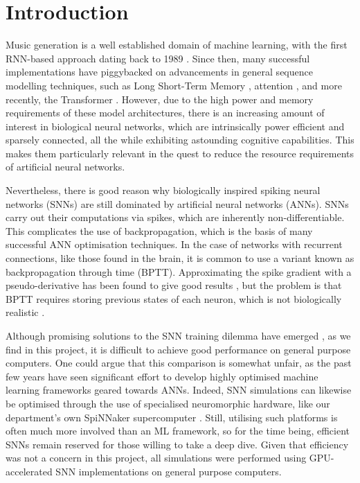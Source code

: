 \documentclass[../../report.tex]{subfiles}
\begin{document}
\chapter{Introduction}

Music generation is a well established domain of machine learning, with the
first RNN-based approach dating back to 1989 \cite{Todd1989}. Since then, many
successful implementations have piggybacked on advancements in general sequence
modelling techniques, such as Long Short-Term Memory \cite{Eck2002}, attention
\cite{Waite2016}, and more recently, the Transformer \cite{Huang2018}. However,
due to the high power and memory requirements of these model architectures,
there is an increasing amount of interest in biological neural networks, which
are intrinsically power efficient and sparsely connected, all the while
exhibiting astounding cognitive capabilities. This makes them particularly
relevant in the quest to reduce the resource requirements of artificial neural
networks.

Nevertheless, there is good reason why biologically inspired spiking neural
networks (SNNs) are still dominated by artificial neural networks (ANNs). SNNs
carry out their computations via spikes, which are inherently
non-differentiable. This complicates the use of backpropagation, which is the
basis of many successful ANN optimisation techniques. In the case of networks
with recurrent connections, like those found in the brain, it is common to use a
variant known as backpropagation through time (BPTT). Approximating the spike
gradient with a pseudo-derivative has been found to give good results
\cite{Bellec2018LSNN}, but the problem is that BPTT requires storing previous
states of each neuron, which is not biologically realistic \cite{Lillicrap2019}.

Although promising solutions to the SNN training dilemma have emerged
\cite{Bellec2020}, as we find in this project, it is difficult to achieve good
performance on general purpose computers. One could argue that this comparison
is somewhat unfair, as the past few years have seen significant effort to
develop highly optimised machine learning frameworks geared towards ANNs.
Indeed, SNN simulations can likewise be optimised through the use of specialised
neuromorphic hardware, like our department's own SpiNNaker supercomputer
\cite{Furber2014}. Still, utilising such platforms is often much more involved
than an ML framework, so for the time being, efficient SNNs remain reserved for
those willing to take a deep dive. Given that efficiency was not a concern in
this project, all simulations were performed using GPU-accelerated SNN
implementations on general purpose computers.
\end{document}

